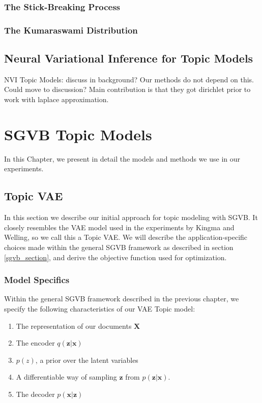 \documentclass{report}
\begin{document}
\subsection{The Stick-Breaking Process}\label{sb_process}

\subsection{The Kumaraswami Distribution}\label{kum}




\section{Neural Variational Inference for Topic Models}\label{NVItopic}
NVI Topic Models: discuss in background? Our methods do not depend on this. Could move to discussion? Main contribution is that they got dirichlet  prior to work with laplace approximation.




\chapter{SGVB Topic Models}
In this Chapter, we present in detail the models and methods we use in our experiments. 

\section{Topic VAE}\label{TopicVAE}

In this section we describe our initial approach for topic modeling with SGVB. It closely resembles the VAE model used in the experiments by Kingma and Welling\cite{kingma2013auto}, so we call this a Topic VAE. We will describe the application-specific choices made within the general SGVB framework as described in section \ref{sgvb_section}, and derive the objective function used for optimization. 

\subsection{Model Specifics}

Within the general SGVB framework described in the previous chapter, we specify the following characteristics of our VAE Topic model:

\begin{enumerate}
	\item The representation of our documents $\mathbf{X}$
	\item The encoder $q(\mathbf{z}|\mathbf{x})$
	\item $p(z)$, a prior  over the latent variables
	\item A differentiable way of sampling $\mathbf{z}$ from $p(\mathbf{z}|\mathbf{x})$. 
	\item The decoder $p(\mathbf{x}|\mathbf{z})$
\end{enumerate}
\end{document}
